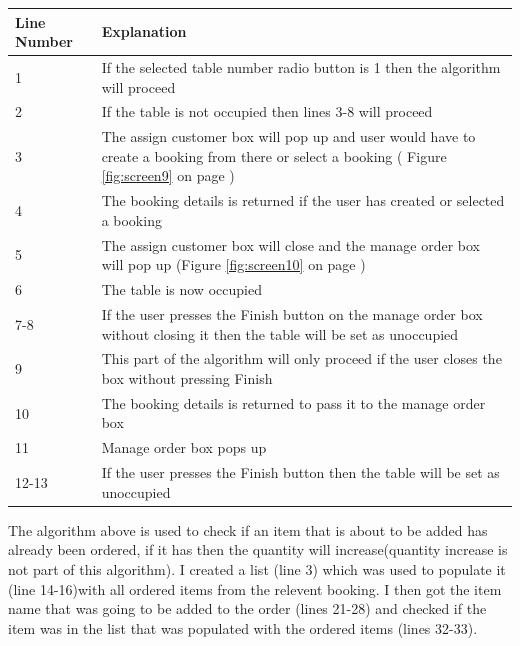 {\begin{center}
\begin{tabular}{|p{5cm}|p{7.5cm}|}
\hline
\textbf{Line Number} & \textbf{Explanation} \\ \hline
1 & If the selected table number radio button is 1 then the algorithm will proceed \\ \hline
2 & If the table is not occupied then lines 3-8 will proceed \\ \hline
3 & The assign customer box will pop up and user would have to create a booking from there or select a booking ( Figure \ref{fig:screen9} on page \pageref{fig:screen9}) \\ \hline
4 & The booking details is returned if the user has created or selected a booking \\ \hline
5 & The assign customer box will close and the manage order box will pop up  (Figure \ref{fig:screen10} on page \pageref{fig:screen10}) \\ \hline
6 & The table is now occupied \\ \hline
7-8 & If the user presses the Finish button on the manage order box without closing it then the table will be set as unoccupied \\ \hline
9 & This part of the algorithm will only proceed if the user closes the box without pressing Finish \\ \hline
10 & The booking details is returned to pass it to the manage order box \\ \hline
11& Manage order box pops up \\ \hline
12-13 & If the user presses the Finish button then the table will be set as unoccupied \\ \hline
 
\end{tabular}
\end{center}

\newpage
{}
The algorithm above is used to check if an item that is about to be added has already been ordered, if it has then the quantity will increase(quantity increase is not part of this algorithm). I created a list (line 3) which was used to populate it (line 14-16)with all ordered items from the relevent booking. I then got the item name that was going to be added to the order (lines 21-28) and checked if the item was in the list that was populated with the ordered items (lines 32-33).

\newpage

}
